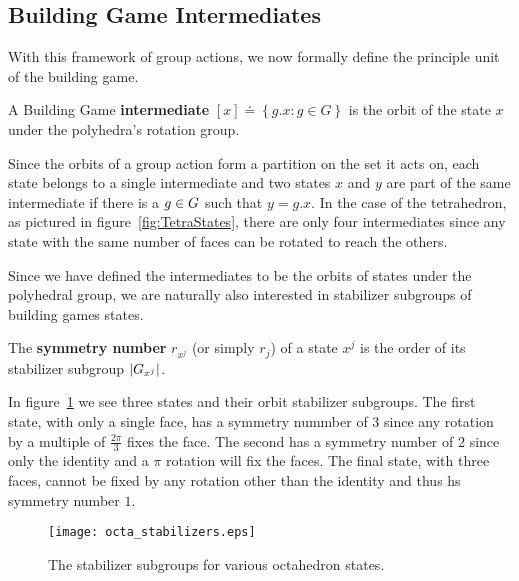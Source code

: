 \subsection{Building Game Intermediates}

With this framework of group actions, we now formally define the principle unit of the building game. 
\begin{mydef}
A Building Game \textbf{intermediate} $[x] \doteq \left\{g.x : g \in G\right\}$ is the orbit of the state $x$ under the polyhedra's rotation group. 
\end{mydef}
Since the orbits of a group action form a partition on the set it acts on, each state belongs to a single intermediate and two states $x$ and $y$ are part of the same intermediate if there is a $g\in{G}$ such that $y = g.x$. In the case of the tetrahedron, as pictured in figure~\ref{fig:TetraStates}, there are only four intermediates since any state with the same number of faces can be rotated to reach the others. 


Since we have defined the intermediates to be the orbits of states under the polyhedral group, we are naturally also interested in stabilizer subgroups of building games states.
\begin{mydef}
The \textbf{symmetry number} $r_{x^j}$ (or simply $r_j$) of a state $x^j$ is the order of its stabilizer subgroup $\left|{G}_{x^j}\right|$.
\end{mydef}
In figure~\ref{fig:OctaStabs} we see three states and their orbit stabilizer subgroups. The first state, with only a single face, has a symmetry nummber of $3$ since any rotation by a multiple of $\frac{2\pi}{3}$ fixes the face. The second has a symmetry number of $2$ since only the identity and a $\pi$ rotation will fix the faces. The final state, with three faces, cannot be fixed by any rotation other than the identity and thus hs symmetry number $1$.  
\begin{figure}[ht]
  \texttt{[image: octa\_stabilizers.eps]}
\caption{The stabilizer subgroups for various octahedron states.}
\label{fig:OctaStabs}
\end{figure}

